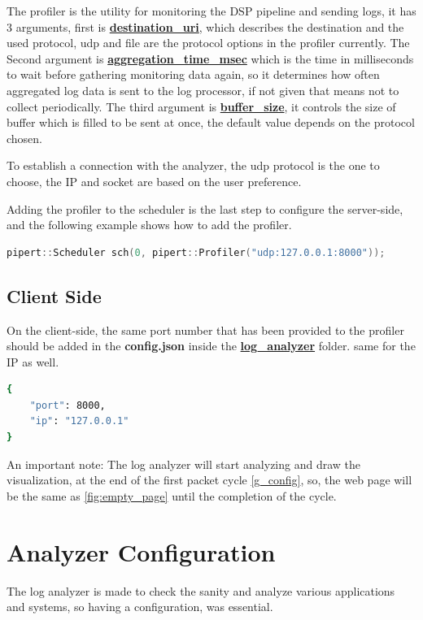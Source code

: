 The profiler is the utility for monitoring the DSP pipeline and sending logs,
it has 3 arguments, first is \textbf{\url{destination_uri}},
which describes the destination and the used protocol, udp and file
are the protocol options in the profiler currently. The Second argument
is \textbf{\url{aggregation_time_msec}} which is the time in milliseconds to wait 
before gathering monitoring data again, so it determines how often aggregated
log data is sent to the log processor, if not given that means not to collect
periodically. The third argument is \textbf{\url{buffer_size}}, it controls the size
of buffer which is filled to be sent at once, the default value depends on the
protocol chosen.

To establish a connection with the analyzer, the udp protocol
is the one to choose, the IP and socket are based on the user
preference.

Adding the profiler to the scheduler is the last step to configure
the server-side, and the following example shows how to add the profiler.
\newline
\begin{lstlisting}[language=c++, caption={Adding profiler},captionpos=b]
	pipert::Scheduler sch(0, pipert::Profiler("udp:127.0.0.1:8000"));
\end{lstlisting}

\subsection{Client Side}\label{client_side}
On the client-side, the same port number that has been provided to the profiler
should be added in the \textbf{config.json} inside the \textbf{\url{log_analyzer}} folder. same for
the IP as well.
\newline
\begin{lstlisting}[language=bash, caption={connection configuration},captionpos=b]
{
    "port": 8000,
    "ip": "127.0.0.1"
}
\end{lstlisting}

An important note: The log analyzer will start analyzing and
draw the visualization, at the end of the first packet cycle \ref{g_config}, so, 
the web page will be the same as \ref{fig:empty_page} 
until the completion of the cycle.

\section{Analyzer Configuration}
The log analyzer is made to check the sanity and analyze various
applications and systems, so having a configuration, was essential.

